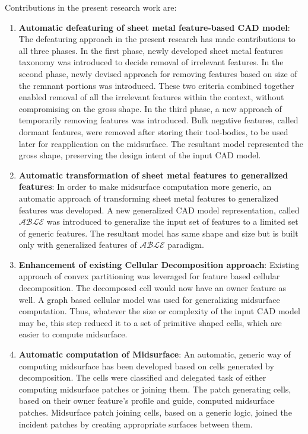 Contributions in the present research work are:%
\begin{enumerate}
\item {\bf Automatic defeaturing of sheet metal feature-based CAD model}:  The defeaturing approach in the present research has made contributions to all three phases. In the first phase, newly developed sheet metal features taxonomy was introduced to decide removal of irrelevant features. In the second phase, newly devised approach for removing features based on size of the remnant portions was introduced. These two criteria combined together enabled removal of all the irrelevant features within the context, without compromising on the gross shape. In the third phase, a new approach of temporarily removing features was introduced. Bulk negative features, called dormant features, were removed after storing their tool-bodies, to be used later for reapplication on the midsurface. The resultant model represented the gross shape, preserving the design intent of the input CAD model.
\item {\bf Automatic transformation of sheet metal features to generalized features}: In order to make midsurface computation more generic, an automatic approach of  transforming sheet metal features to generalized features was developed. A new generalized CAD model representation, called $\mathcal{ABLE}$ was introduced to generalize the input set of features to a limited set of generic features. The resultant model has same shape and size but is built only with generalized features of $\mathcal{ABLE}$ paradigm.
\item {\bf Enhancement of existing Cellular Decomposition approach}: Existing approach of convex partitioning was leveraged for feature based cellular decomposition. The decomposed cell would now have an owner feature as well. A graph based cellular model was used for generalizing midsurface computation. Thus, whatever the size or complexity of the input CAD model may be, this step reduced it to a set of primitive shaped cells, which are easier to compute midsurface.
\item {\bf Automatic computation of Midsurface}: An automatic, generic way of computing midsurface has been developed based on cells generated by decomposition. The cells were classified and delegated task of either computing midsurface patches or joining them. The patch generating cells, based on their owner feature's profile and guide, computed midsurface patches. Midsurface patch joining cells, based on a generic logic, joined the incident patches by creating appropriate surfaces between them.

\end{enumerate}
